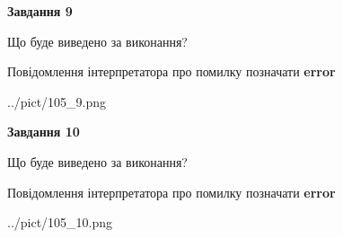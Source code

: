 \documentclass[12pt, ukrainian]{article}
\begin{document}
{{\begin {center}\textbf{Завдання 9}\end {center}}\par
Що буде виведено за виконання? \par
Повідомлення інтерпретатора про помилку позначати \textbf{error}

\begin{center}
	{../pict/105_9.png}
\end{center}
\newpage

{\begin {center}\textbf{Завдання 10}\end {center}}\par
Що буде виведено за виконання? \par
Повідомлення інтерпретатора про помилку позначати \textbf{error}

\begin{center}
	{../pict/105_10.png}
\end{center}
\newpage

}
\end{document}
